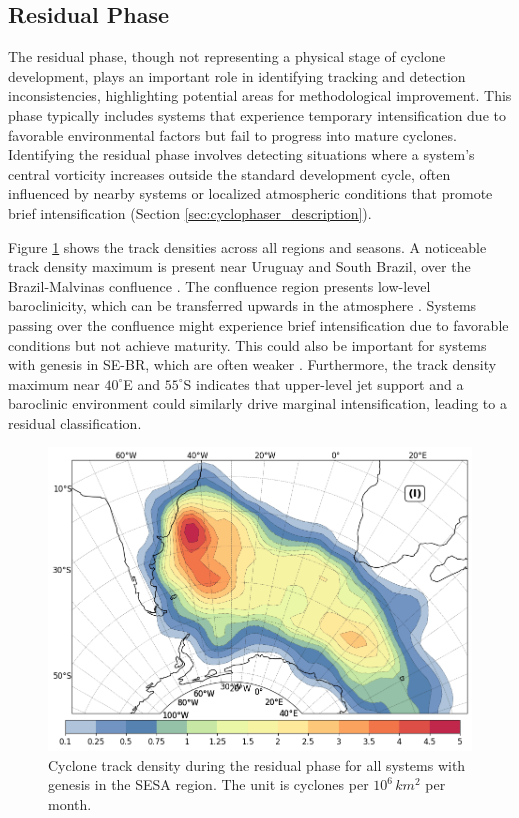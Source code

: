 \subsection{Residual Phase}\label{residual_phase}


The residual phase, though not representing a physical stage of cyclone development, plays an important role in identifying tracking and detection inconsistencies, highlighting potential areas for methodological improvement. This phase typically includes systems that experience temporary intensification due to favorable environmental factors but fail to progress into mature cyclones. Identifying the residual phase involves detecting situations where a system's central vorticity increases outside the standard development cycle, often influenced by nearby systems or localized atmospheric conditions that promote brief intensification (Section \ref{sec:cyclophaser_description}).

Figure \ref{fig:residual} shows the track densities across all regions and seasons. A noticeable track density maximum is present near Uruguay and South Brazil, over the Brazil-Malvinas confluence \citep{gordon1989brazil}. The confluence region presents low-level baroclinicity, which can be transferred upwards in the atmosphere \citep[e.g.,]{sanders1980synoptic, vera2002cold}. Systems passing over the confluence might experience brief intensification due to favorable conditions but not achieve maturity. This could also be important for systems with genesis in SE-BR, which are often weaker \citep{sinclair1995climatology, hoskins2005new}. Furthermore, the track density maximum near \(40^\circ\)E and \(55^\circ\)S indicates that upper-level jet support \citep[e.g.,]{swart2015comparing} and a baroclinic environment \citep[e.g.,]{hoskins2005new} could similarly drive marginal intensification, leading to a residual classification.

\begin{figure}[!htbp]
\centering
\includegraphics[width=\textwidth]{figs_4/density_map_residual_aggregate.png}
\caption[Track Density - Residual Phase]{Cyclone track density during the residual phase for all systems with genesis in the SESA region. The unit is cyclones per \(10^6 \, km^2\) per month.}
\label{fig:residual}
\end{figure}


